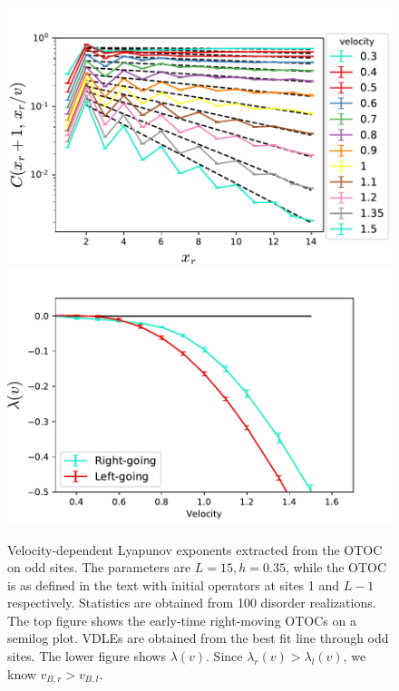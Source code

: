 \documentclass[aps,prx,reprint,superscriptaddress, longbibliography]{revtex4-1}
\begin{document}
\begin{figure}
	\includegraphics[width=\columnwidth]{oddVDLEfromOTOCs}
	\includegraphics[width=\columnwidth]{oddVDLE}
	\caption{Velocity-dependent Lyapunov exponents extracted from the OTOC on odd sites. The parameters are $L=15, h=0.35$, while the OTOC is as defined in the text with initial operators at sites 1 and $L-1$ respectively. Statistics are obtained from 100 disorder realizations. The top figure shows the early-time right-moving OTOCs on a semilog plot. VDLEs are obtained from the best fit line through odd sites. The lower figure shows $\lambda(v)$. Since $\lambda_r(v)>\lambda_l(v)$, we know $v_{B,r}>v_{B,l}$.}
	\label{fig:vdle}
\end{figure}
\end{document}
